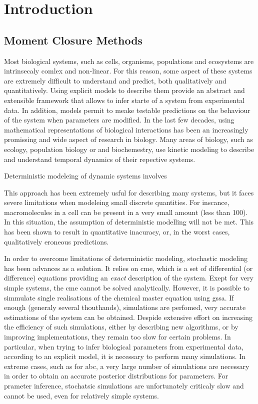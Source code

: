 \section{Introduction} \label{intro}
\subsection{Moment Closure Methods}


Most biological systems, such as cells, organisms, populations and ecosystems are intrinsecaly comlex and non-linear.
For this reason, some aspect of these systems are extremely difficult to understand and predict, both qualitatively and quantitatively.
Using explicit models to describe them provide an abstract and extensible framework that allows to infer starte of a system from experimental data. 
In addition, models permit to meake testable predictions on the behaviour of the system when parameters are modified.
In the last few decades, using mathematical representations of biological interactions has been an increasingly promissing and wide aspect of research in biology.
Many areas of biology, such as ecology, population biology or and biochemestry, use kinetic modeling to describe and understand temporal dynamics of their repective systems.

Deterministic modeleing of dynamic systems involves 

This approach has been extremely usful for describing many systems, but it faces severe limitations when modeleing small discrete quantities.
For inscance, macromolecules in a cell can be present in a very small amount (less than 100). 
In this situation, the assumption of deterministic modelling will not be met. 
This has been shown to result in quantitative inacuracy, or, in the worst cases, qualitatively eroneous predictions.


In order to overcome limitations of deterministic modeling, stochastic modeling has been advances as a solution.
It relies on \gls{cme}, which is a set of differential (or difference) equations providing an \emph{exact} description of the system.
Exept for very simple systems, the \gls{cme} cannot be solved analytically. 
However, it is possible to simmulate single realisations of the chemical master equation using \gls{gssa}.
If enough (generaly several thouthands), simulations are perfomed, very accurate estimations of the system can be obtained.
Despide extensive effort on increasing the efficiency of such simulations, either by describing new algorithms, or by improving implementations,
they remain too slow for certain problems. 
In particular, when trying to infer biological parameters from experimental data, according to an explicit model,
it is necessary to perform many simulations. 
In extreme cases, such as for \gls{abc}, a very large number of simulations are necessary in order to obtain an accurate posterior distributions for parameters.
For prameter inference, stochatsic simulations are unfortunately  criticaly slow and cannot be used, even for relatively simple systems.


